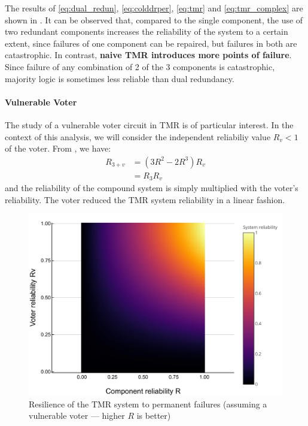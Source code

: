 \documentclass[a4paper,nobib]{tufte-book}
\def\acusepage#1{}
\begin{document}
The results of \eqref{eq:dual_redun}, \eqref{eq:colddrper}, \eqref{eq:tmr} and \eqref{eq:tmr_complex} are shown in . It can be observed that, compared to the single component, the use of two redundant components increases the reliability of the system to a certain extent, since failures of one component can be repaired, but failures in both are catastrophic. In contrast, \textbf{naive \acs{TMR} introduces more points of failure}. Since failure of any combination of 2 of the 3 components is catastrophic, majority logic is sometimes less reliable than dual redundancy.

\paragraph{\textbf{Vulnerable Voter}}\hspace{0pt}
\acusepage{voter}

The study of a vulnerable voter circuit in \acs{TMR} is of particular interest. In the context of this analysis, we will consider the independent reliabiliy value \( R_v < 1 \) of the voter. From \autocite[31]{birolini_reliability_engineering_2004}, we have:
\begin{align}
R_{3+v} &= (3R^2 - 2R^3)R_v \nonumber \\
&= R_3R_v
\end{align}
and the reliability of the compound system is simply multiplied with the voter's reliability. The voter reduced the \acs{TMR} system reliability in a linear fashion.

\begin{figure}
	\centering
	\includegraphics{analysis/reliability_norepair_voter_en}
	\caption[Resilience of the TMR system to permanent failures (assuming a vulnerable voter)]{Resilience of the \acs{TMR} system to permanent failures (assuming a vulnerable voter --- higher \(R\) is better)}
	\label{fig:reliability_norepair_voter}
\end{figure}
\end{document}
